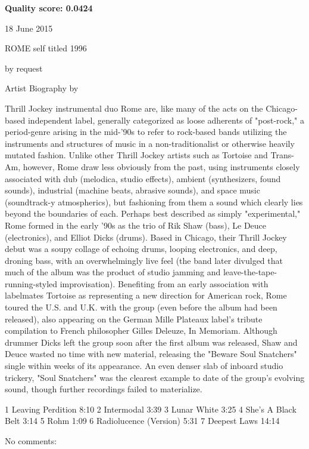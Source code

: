 \documentclass[conference]{IEEEtran}
\begin{document}
\textbf{Quality score: 0.0424}
\begin{textbox}

    
18 June 2015

ROME self titled 1996

by request

Artist Biography by

Thrill Jockey instrumental duo Rome are, like many of the acts on the Chicago-based independent label, generally categorized as loose adherents of "post-rock," a period-genre arising in the mid-'90s to refer to rock-based bands utilizing the instruments and structures of music in a non-traditionalist or otherwise heavily mutated fashion. Unlike other Thrill Jockey artists such as Tortoise and Trans-Am, however, Rome draw less obviously from the past, using instruments closely associated with dub (melodica, studio effects), ambient (synthesizers, found sounds), industrial (machine beats, abrasive sounds), and space music (soundtrack-y atmospherics), but fashioning from them a sound which clearly lies beyond the boundaries of each. Perhaps best described as simply "experimental," Rome formed in the early '90s as the trio of Rik Shaw (bass), Le Deuce (electronics), and Elliot Dicks (drums). Based in Chicago, their Thrill Jockey debut was a soupy collage of echoing drums, looping electronics, and deep, droning bass, with an overwhelmingly live feel (the band later divulged that much of the album was the product of studio jamming and leave-the-tape-running-styled improvisation). Benefiting from an early association with labelmates Tortoise as representing a new direction for American rock, Rome toured the U.S. and U.K. with the group (even before the album had been released), also appearing on the German Mille Plateaux label's tribute compilation to French philosopher Gilles Deleuze, In Memoriam. Although drummer Dicks left the group soon after the first album was released, Shaw and Deuce wasted no time with new material, releasing the "Beware Soul Snatchers" single within weeks of its appearance. An even denser slab of inboard studio trickery, "Soul Snatchers" was the clearest example to date of the group's evolving sound, though further recordings failed to materialize. 


1 Leaving Perdition 8:10
2 Intermodal 3:39
3 Lunar White 3:25
4 She's A Black Belt 3:14
5 Rohm 1:09
6 Radiolucence (Version) 5:31
7 Deepest Laws 14:14

No comments:
\end{textbox}
\end{document}
